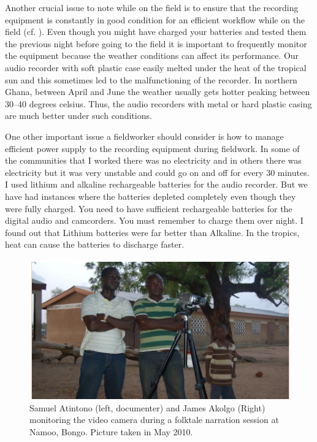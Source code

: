 \documentclass[output=paper,colorlinks,citecolor=brown]{langscibook}
\begin{document}
Another crucial issue to note while on the field is to ensure that the recording equipment is constantly in good condition for an efficient workflow while on the field (cf. \citealt{Bowern2015}). Even though you might have charged your batteries and tested them the previous night before going to the field it is important to frequently monitor the equipment because the weather conditions can affect its performance. Our audio recorder with soft plastic case easily melted under the heat of the tropical sun and this sometimes led to the malfunctioning of the recorder. In northern Ghana, between April and June the weather usually gets hotter peaking between 30--40 degrees celsius. Thus, the audio recorders with metal or hard plastic casing are much better under such conditions.

One other important issue a fieldworker should consider is how to manage efficient power supply to the recording equipment during fieldwork. In some of the communities that I worked there was no electricity and in others there was electricity but it was very unstable and could go on and off for every 30 minutes. I used lithium and alkaline rechargeable batteries for the audio recorder. But we have had instances where the batteries depleted completely even though they were fully charged. You need to have sufficient rechargeable batteries for the digital audio and camcorders. You must remember to charge them over night. I found out that Lithium batteries were far better than Alkaline. In the tropics, heat can cause the batteries to discharge faster.

\begin{figure}
\includegraphics[scale=0.55]{../figures/samuel.png}
\caption{Samuel Atintono (left, documenter) and James Akolgo (Right) monitoring the video 
 		camera during a folktale narration session at Namoo, Bongo. Picture taken in May 2010.}

\end{figure}
\end{document}
